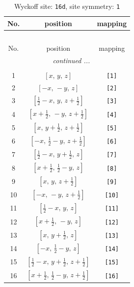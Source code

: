 \documentclass[fleqn,8pt]{jsarticle}
\begin{document}
\begin{longtable}{ccc}
\caption{Wyckoff site: {\tt 16d}, site symmetry: {\tt 1}}
 \\
 \hline \hline
No. & position & mapping \\ \hline \endfirsthead

\multicolumn{2}{l}{\tablename\ \thetable{}} \\
 \hline \hline
No. & position & mapping \\ \hline \endhead

 \hline \hline
\multicolumn{2}{r}{\footnotesize\it continued ...} \\ \endfoot

 \hline \hline
\multicolumn{2}{r}{} \\ \endlastfoot

1 & $\left[ x,\, y,\, z \right]$ & {\tt [1]} \\ \hline
2 & $\left[ - x,\, - y,\, z \right]$ & {\tt [2]} \\ \hline
3 & $\left[ \frac{1}{2} - x,\, y,\, z + \frac{1}{2} \right]$ & {\tt [3]} \\ \hline
4 & $\left[ x + \frac{1}{2},\, - y,\, z + \frac{1}{2} \right]$ & {\tt [4]} \\ \hline
5 & $\left[ x,\, y + \frac{1}{2},\, z + \frac{1}{2} \right]$ & {\tt [5]} \\ \hline
6 & $\left[ - x,\, \frac{1}{2} - y,\, z + \frac{1}{2} \right]$ & {\tt [6]} \\ \hline
7 & $\left[ \frac{1}{2} - x,\, y + \frac{1}{2},\, z \right]$ & {\tt [7]} \\ \hline
8 & $\left[ x + \frac{1}{2},\, \frac{1}{2} - y,\, z \right]$ & {\tt [8]} \\ \hline
9 & $\left[ x,\, y,\, z + \frac{1}{2} \right]$ & {\tt [9]} \\ \hline
10 & $\left[ - x,\, - y,\, z + \frac{1}{2} \right]$ & {\tt [10]} \\ \hline
11 & $\left[ \frac{1}{2} - x,\, y,\, z \right]$ & {\tt [11]} \\ \hline
12 & $\left[ x + \frac{1}{2},\, - y,\, z \right]$ & {\tt [12]} \\ \hline
13 & $\left[ x,\, y + \frac{1}{2},\, z \right]$ & {\tt [13]} \\ \hline
14 & $\left[ - x,\, \frac{1}{2} - y,\, z \right]$ & {\tt [14]} \\ \hline
15 & $\left[ \frac{1}{2} - x,\, y + \frac{1}{2},\, z + \frac{1}{2} \right]$ & {\tt [15]} \\ \hline
16 & $\left[ x + \frac{1}{2},\, \frac{1}{2} - y,\, z + \frac{1}{2} \right]$ & {\tt [16]} \\
\end{longtable}
\end{document}
